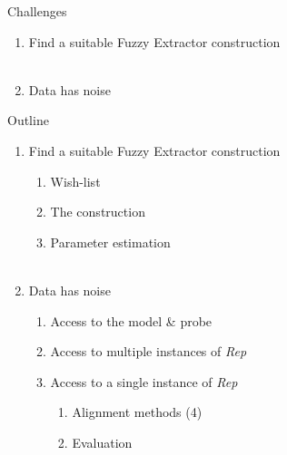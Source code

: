 \documentclass{beamer}
\def\fe{Fuzzy Extractor\xspace}
\newcommand{\rep}{\textit{Rep}\xspace}
\begin{document}
\begin{frame}{Challenges}
   \begin{enumerate}
       \item Find a suitable \fe construction\\~\pause 
       
       \item Data has noise
   \end{enumerate} 
 \end{frame}
 \begin{frame}{Outline}
   \begin{enumerate}
       \item Find a suitable \fe construction~\pause
    \begin{enumerate}
        \item Wish-list~\pause
        \item The construction~\pause
        \item Parameter estimation\\~\pause
    \end{enumerate}
       \item Data has noise~\pause
       \begin{enumerate}
           \item Access to the model \& probe~\pause
           \item Access to multiple instances of \rep~\pause
           \item Access to a single instance of \rep~\pause
            \begin{enumerate}
                \item Alignment methods (4)~\pause
                \item Evaluation
            \end{enumerate}
       \end{enumerate}    
   \end{enumerate} 
\end{frame}
\end{document}
